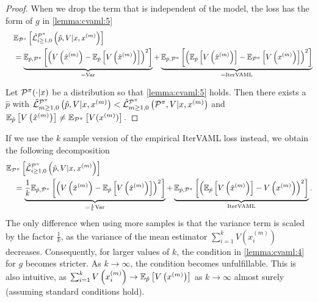 \begin{proof}
When we drop the term that is independent of the model, the loss has the form of $g$ in \autoref{lemma:cvaml:5}
\begin{align}
   & \EEX{\P^\pi}{\hat{\mathcal{L}}^{\P^\pi}_{i\geq1,0}\left(\hat{p},V|x,x^{(m)}\right)} \\
   \quad & =  \underbrace{\EEX{\hat{p},\P^\pi}{\left(V\left(\hat{x}^{(m)}\right) - \EEX{\hat{p}}{V\left(\hat{x}^{(m)}\right)}\right)^2}}_{= \mathrm{Var}} + \underbrace{\EEX{\hat{p},\P^\pi}{\left(\EEX{\hat{p}}{V\left(\hat{x}^{(m)}\right)} - \EEX{\P^\pi}{V\left(x^{(m)}\right)}\right)^2}}_{= \mathrm{IterVAML}}
\end{align}

 Let $\P^\pi(\cdot|x)$ be a distribution so that \autoref{lemma:cvaml:5} holds. Then there exists a $\hat{p}$ with $\hat{\mathcal{L}}^{\P^\pi}_{m\geq1,0}\left(\hat{p},V|x,x^{(m)}\right) < \hat{\mathcal{L}}^{\P^\pi}_{m\geq1,0}\left(\P^\pi,V|x,x^{(m)}\right)$ and $\EEX{\hat{p}}{V\left(\hat{x}^{(m)}\right)} \neq \EEX{\P^\pi}{V(x^{(m)})}.$
\end{proof}

If we use the $k$ sample version of the empirical IterVAML loss instead, we obtain the following decomposition
\begin{align}
    &\EEX{\P^\pi}{\hat{\mathcal{L}}^{\P^\pi}_{i\geq1,0}\left(\hat{p},V|x,x^{(m)}\right)} \\
    &\quad = \underbrace{\frac{1}{k}\EEX{\hat{p},\P^\pi}{\left(V\left(\hat{x}^{(m)}\right) - \EEX{\hat{p}}{V\left(\hat{x}^{(m)}\right)}\right)^2}}_{=\frac{1}{k} \mathrm{Var}} + \underbrace{\EEX{\hat{p},\P^\pi}{\left(\EEX{\hat{p}}{V\left(\hat{x}^{(m)}\right)} - V\left(x^{(m)}\right)\right)^2}}_{\mathrm{IterVAML}}.
\end{align}
The only difference when using more samples is that the variance term is scaled by the factor $\frac{1}{k}$, as the variance of the mean estimator $\sum_{i=1}^k V\left(x^{(m)}_i\right)$ decreases.
Consequently, for larger values of $k$, the condition in \autoref{lemma:cvaml:4} for $g$ becomes stricter.
As $k \rightarrow \infty$, the condition becomes unfulfillable. 
This is also intuitive, as $\sum_{i=1}^k V\left(x^{(m)}_i\right) \rightarrow \EEX{\hat{p}}{V\left(x^{(m)}\right)}$ as $k \rightarrow \infty$ almost surely (assuming standard conditions hold).


